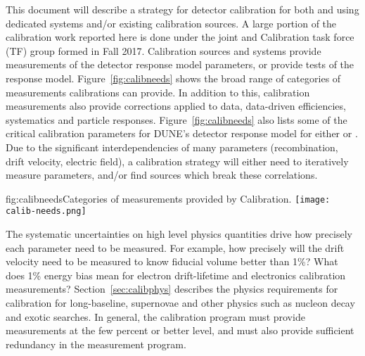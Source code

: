 This document will describe a strategy for detector calibration for both 
 and 
using dedicated   systems and/or existing calibration sources. A large portion of the calibration work reported here is done under the joint   and  Calibration task force (TF) group formed in Fall 2017. Calibration sources and systems provide measurements of the detector response model parameters, or provide tests of the response model.
Figure~\ref{fig:calibneeds} shows the broad range of categories of measurements calibrations can provide. In addition to this, calibration measurements also provide corrections applied to data, data-driven efficiencies, systematics and particle responses. Figure~\ref{fig:calibneeds} also lists some of the critical calibration parameters for DUNE's detector response model for either   or .
Due to the significant interdependencies of many parameters (recombination, drift velocity, electric field), a calibration strategy will either need to iteratively measure parameters, and/or find sources which break these correlations. 

\begin{dunefigure}{fig:calibneeds}{Categories of measurements provided by Calibration.}
\texttt{[image: calib-needs.png]}
\end{dunefigure}

The systematic uncertainties on high level physics quantities drive how precisely each parameter need to be measured. For example, how precisely will the drift velocity need to be measured to know fiducial volume better than \num{1}\%?  What does \num{1}\% energy bias mean for electron drift-lifetime and electronics calibration measurements? Section~\ref{sec:calibphys} describes the physics requirements for calibration for long-baseline, supernovae and other physics such as nucleon decay and exotic searches. In general, the calibration program must provide measurements at the few percent or better level, and must also provide sufficient redundancy in the measurement program.

